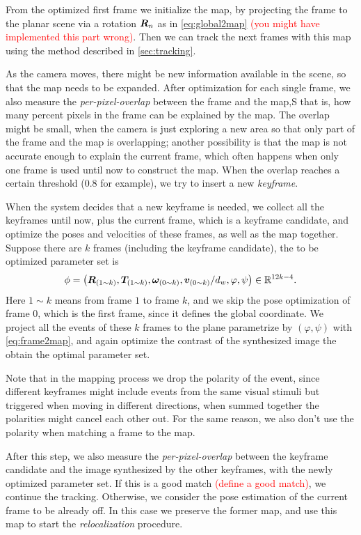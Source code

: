 From the optimized first frame we initialize the map, by projecting
the frame to the planar scene via a rotation $\mat{R}_n$ as in
\cref{eq:global2map} \textcolor{red}{(you might have implemented this
  part wrong)}. Then we can track the next frames with this map using
the method described in \cref{sec:tracking}.

As the camera moves, there might be new information available in the
scene, so that the map needs to be expanded. After optimization for
each single frame, we also measure the \textit{per-pixel-overlap}
between the frame and the map,S that is, how many percent pixels in the
frame can be explained by the map. The overlap might be small, when
the camera is just exploring a new area so that only part of the frame
and the map is overlapping; another possibility is that the map is not
accurate enough to explain the current frame, which often happens when
only one frame is used until now to construct the map. When the
overlap reaches a certain threshold (0.8 for example), we try to
insert a new \textit{keyframe}.

When the system decides that a new keyframe is needed, we collect all
the keyframes until now, plus the current frame, which is a keyframe
candidate, and optimize the poses and velocities of these frames, as
well as the map together. Suppose there are $k$ frames (including the
keyframe candidate), the to be optimized parameter set is
\begin{equation*}
  \phi=\left(\mat{R}_{(1\sim k)},\vec{T}_{(1\sim
      k)},\bm{\omega}_{(0\sim k)},\vec{v}_{(0\sim
      k)}/d_w,\varphi,\psi\right)\in\mathbb{R}^{12k-4}.
\end{equation*}
Here $1\sim k$ means from frame $1$ to frame $k$, and we skip the pose
optimization of frame $0$, which is the first frame, since it defines
the global coordinate. We project all the events of these $k$ frames
to the plane parametrize by $(\varphi,\psi)$ with \cref{eq:frame2map},
and again optimize the contrast of the synthesized image the obtain
the optimal parameter set.

Note that in the mapping process we drop the polarity of the event,
since different keyframes might include events from the same visual
stimuli but triggered when moving in different directions, when summed
together the polarities might cancel each other out. For the same
reason, we also don't use the polarity when matching a frame to the
map.

After this step, we also measure the \textit{per-pixel-overlap}
between the keyframe candidate and the image synthesized by the other
keyframes, with the newly optimized parameter set. If this is a good
match \textcolor{red}{(define a good match)}, we continue the
tracking. Otherwise, we consider the pose estimation of the current
frame to be already off. In this case we preserve the former map, and
use this map to start the \textit{relocalization} procedure.

